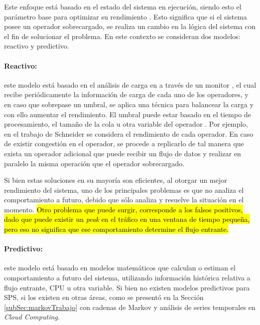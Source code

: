 Este enfoque está basado en el estado del sistema en ejecución, siendo esto el parámetro base para optimizar su rendimiento \citep{CasavantK88}. Esto significa que si el sistema posee un operador sobrecargado, se realiza un cambio en la lógica del sistema con el fin de solucionar el problema. En este contexto se consideran dos modelos: reactivo y predictivo.

\paragraph{Reactivo:} este modelo está basado en el análisis de carga en a través de un monitor \citep{GulisanoJPSV12}, el cual recibe periódicamente la información de carga de cada uno de los operadores, y en caso que sobrepase un umbral, se aplica una técnica para balancear la carga y con ello aumentar el rendimiento. El umbral puede estar basado en el tiempo de procesamiento, el tamaño de la cola u otra variable del operador \citep{BhuvanagiriGKS06}. Por ejemplo, en el trabajo de Schneider \citep{SchneiderAGBW09} se considera el rendimiento de cada operador. En caso de existir congestión en el operador, se procede a replicarlo de tal manera que exista un operador adicional que puede recibir un flujo de datos y realizar en paralelo la misma operación que el operador sobrecargado.

Si bien estas soluciones en su mayoría son eficientes, al otorgar un mejor rendimiento del sistema, uno de los principales problemas es que no analiza el comportamiento a futuro, debido que sólo analiza y resuelve la situación en el momento. \hl{Otro problema que puede surgir, corresponde a los falsos positivos, dado que puede existir un \textit{peak} en el tráfico en una ventana de tiempo pequeña, pero eso no significa que ese comportamiento determine el flujo entrante.}

\paragraph{Predictivo:} este modelo está basado en modelos matemáticos que calculan o estiman el comportamiento a futuro del sistema, utilizando información histórica relativa a flujo entrante, CPU u otra variable. Si bien no existen modelos predictivos para SPS, si los existen en otras áreas, como se presentó en la Sección \ref{subSec:markovTrabajo} con cadenas de Markov y análisis de series temporales en \textit{Cloud Computing}.

